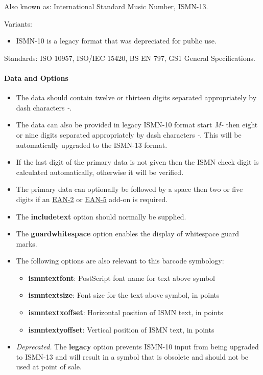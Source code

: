 Also known as: International Standard Music Number, ISMN-13.

Variants:

\begin{itemize}
\tightlist
\item
  ISMN-10 is a legacy format that was depreciated for public use.
\end{itemize}

Standards: ISO 10957, ISO/IEC 15420, BS EN 797, GS1 General
Specifications.

\hypertarget{data-and-options-5}{%
\paragraph{Data and Options}\label{data-and-options-5}}

\begin{itemize}
\tightlist
\item
  The data should contain twelve or thirteen digits separated
  appropriately by dash characters \emph{-}.
\item
  The data can also be provided in legacy ISMN-10 format start \emph{M-}
  then eight or nine digits separated appropriately by dash characters
  \emph{-}. This will be automatically upgraded to the ISMN-13 format.
\item
  If the last digit of the primary data is not given then the ISMN check
  digit is calculated automatically, otherwise it will be verified.
\item
  The primary data can optionally be followed by a space then two or
  five digits if an \protect\hyperlink{ean-2}{EAN-2} or
  \protect\hyperlink{ean-5}{EAN-5} add-on is required.
\item
  The \textbf{includetext} option should normally be supplied.
\item
  The \textbf{guardwhitespace} option enables the display of whitespace
  guard marks.
\item
  The following options are also relevant to this barcode symbology:

  \begin{itemize}
  \tightlist
  \item
    \textbf{ismntextfont}: PostScript font name for text above symbol
  \item
    \textbf{ismntextsize}: Font size for the text above symbol, in
    points
  \item
    \textbf{ismntextxoffset}: Horizontal position of ISMN text, in
    points
  \item
    \textbf{ismntextyoffset}: Vertical position of ISMN text, in points
  \end{itemize}
\item
  \emph{Deprecated.} The \textbf{legacy} option prevents ISMN-10 input
  from being upgraded to ISMN-13 and will result in a symbol that is
  obsolete and should not be used at point of sale.
\end{itemize}

